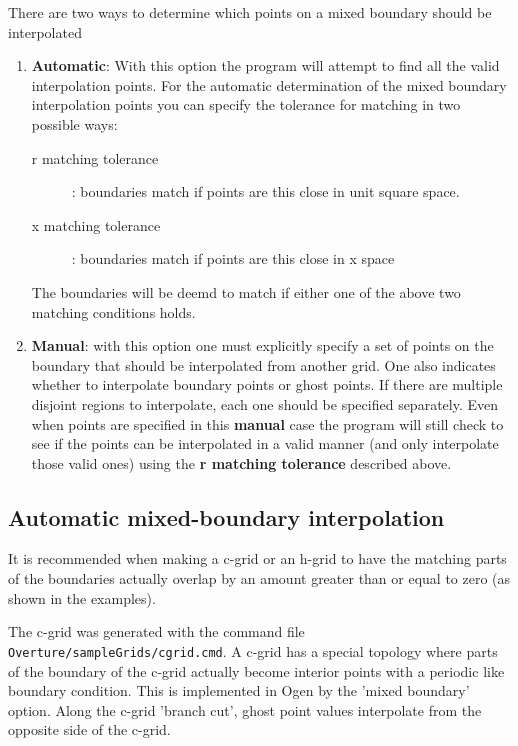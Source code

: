 \documentclass[xcolor=rgb,svgnames,dvipsnames]{article}
\begin{document}
There are two ways to determine which points on a mixed boundary should be interpolated
\begin{enumerate}
 \item {\bf Automatic}: With this option the program will attempt to find all the valid
    interpolation points. 
For the automatic determination of the mixed boundary interpolation points
    you can specify the tolerance for matching in two possible ways:
    \begin{description}   
      \item[r matching tolerance]: boundaries match if points are this close in unit square space.
      \item[x matching tolerance]: boundaries match if points are this close in x space
    \end{description}
   The boundaries will be deemd to match if either one of the above two matching conditions holds.
 \item {\bf Manual}: with this option one must explicitly specify a set of points on the boundary
     that should be interpolated from another grid. 
     One also indicates whether to interpolate boundary points or ghost points.
     If there are multiple disjoint regions to interpolate, each one should be specified separately.
     Even when points are specified in this {\bf manual} case the program will still 
     check to see if the points can be interpolated in a valid manner (and only interpolate those valid ones)
    using the {\bf r matching tolerance} described above.
\end{enumerate}

\subsection{Automatic mixed-boundary interpolation}

It is recommended when making a c-grid or an h-grid to have the matching parts of the boundaries
actually overlap by an amount greater than or equal to zero (as shown in the examples).

The c-grid was generated with the command file {\tt Overture/sampleGrids/cgrid.cmd}.
A c-grid has a special topology where parts of the boundary of the c-grid
actually become interior points with a periodic like boundary condition.
This is implemented in Ogen by the 'mixed boundary' option. Along the
c-grid 'branch cut', ghost point values interpolate from the opposite
side of the c-grid.
\end{document}

